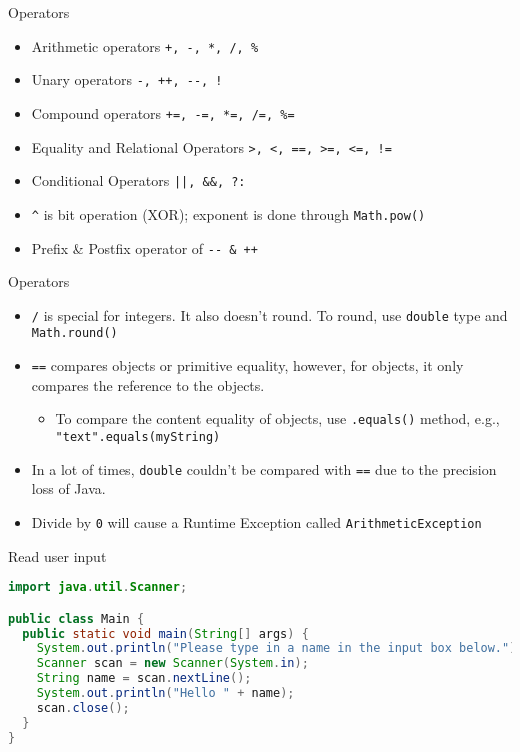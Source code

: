 \documentclass[aspectratio=169]{beamer}
\begin{document}
\begin{frame}[fragile]{Operators}
    \begin{itemize}
        \item Arithmetic operators \verb|+, -, *, /, %|
        \item Unary operators \verb|-, ++, --, !|
        \item Compound operators \verb|+=, -=, *=, /=, %=|
        \item Equality and Relational Operators \verb|>, <, ==, >=, <=, !=|
        \item Conditional Operators \verb_||, &&, ?:_   
        \item \verb|^| is bit operation (XOR); exponent is done through \verb|Math.pow()|
        \item Prefix \& Postfix operator of \verb|-- & ++|
    \end{itemize}
\end{frame}

\begin{frame}[fragile]{Operators}
    \begin{itemize}
        \item \verb|/| is special for integers. It also doesn't round. To round, use \verb|double| type and \verb|Math.round()|
        \item \verb|==| compares objects or primitive equality, however, for objects, it only compares the reference to the objects.
        \begin{itemize}
            \item To compare the content equality of objects, use \verb|.equals()| method, e.g., \verb|"text".equals(myString)|
        \end{itemize}
        \item In a lot of times, \verb|double| couldn't be compared with \verb|==| due to the precision loss of Java.
        \item Divide by \verb|0| will cause a Runtime Exception called \verb|ArithmeticException|
    \end{itemize}
\end{frame}

\begin{frame}[fragile]{Read user input}
    \begin{lstlisting}[language=Java]
import java.util.Scanner;

public class Main {
  public static void main(String[] args) {
    System.out.println("Please type in a name in the input box below.");
    Scanner scan = new Scanner(System.in);
    String name = scan.nextLine();
    System.out.println("Hello " + name);
    scan.close();
  }
}
        
    \end{lstlisting}
\end{frame}
\end{document}
